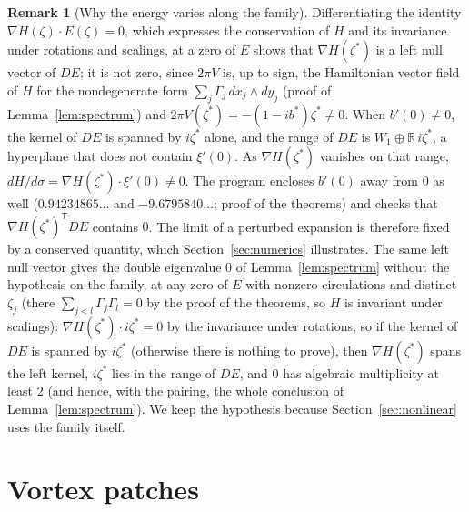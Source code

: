 \documentclass[11pt]{article}
\theoremstyle{definition}
\newtheorem{remark}{Remark}
\newcommand{\R}{\mathbb{R}}
\begin{document}
\begin{remark}[Why the energy varies along the family]\label{rem:energy}
Differentiating the identity $\nabla H(\zeta)\cdot E(\zeta) = 0$, which expresses the conservation of $H$ and its invariance under rotations and scalings, at a zero of $E$ shows that $\nabla H(\zeta^*)$ is a left null vector of $DE$; it is not zero, since $2\pi V$ is, up to sign, the Hamiltonian vector field of $H$ for the nondegenerate form $\sum_j\Gamma_j\,dx_j \wedge dy_j$ (proof of Lemma~\ref{lem:spectrum}) and $2\pi V(\zeta^*) = -(1 - ib^*)\zeta^* \ne 0$. When $b'(0) \ne 0$, the kernel of $DE$ is spanned by $i\zeta^*$ alone, and the range of $DE$ is $W_1 \oplus \R\,i\zeta^*$, a hyperplane that does not contain $\xi'(0)$. As $\nabla H(\zeta^*)$ vanishes on that range, $dH/d\sigma = \nabla H(\zeta^*)\cdot\xi'(0) \ne 0$. The program encloses $b'(0)$ away from $0$ as well ($0.94234865\ldots$ and $-9.6795840\ldots$; proof of the theorems) and checks that $\nabla H(\zeta^*)^{\mathsf T}DE$ contains $0$. The limit of a perturbed expansion is therefore fixed by a conserved quantity, which Section~\ref{sec:numerics} illustrates. The same left null vector gives the double eigenvalue $0$ of Lemma~\ref{lem:spectrum} without the hypothesis on the family, at any zero of $E$ with nonzero circulations and distinct $\zeta_j$ (there $\sum_{j<l}\Gamma_j\Gamma_l = 0$ by the proof of the theorems, so $H$ is invariant under scalings): $\nabla H(\zeta^*)\cdot i\zeta^* = 0$ by the invariance under rotations, so if the kernel of $DE$ is spanned by $i\zeta^*$ (otherwise there is nothing to prove), then $\nabla H(\zeta^*)$ spans the left kernel, $i\zeta^*$ lies in the range of $DE$, and $0$ has algebraic multiplicity at least $2$ (and hence, with the pairing, the whole conclusion of Lemma~\ref{lem:spectrum}). We keep the hypothesis because Section~\ref{sec:nonlinear} uses the family itself.
\end{remark}

\section{Vortex patches}\label{sec:patches}
\end{document}
